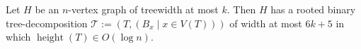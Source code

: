 \documentclass{patmorin}
\newcommand{\pat}[1]{\noindent\textcolor{Magenta}{PaMo: #1}}
\DeclareMathOperator{\height}{height}
\DeclareMathOperator{\lca}{lca}
\newcommand{\Oh}{O}
\newcommand{\calT}{\mathcal{T}}
\begin{document}

\begin{lem}\label{low_height_tree_decomp}
  Let $H$ be an $n$-vertex graph of treewidth at most $k$. Then $H$ has a rooted binary tree-decomposition $\calT:=(T,(B_x\mid x\in V(T)))$ of width at most $6k+5$ in which $\height(T)\in \Oh(\log n)$.
\end{lem}

\end{document}
